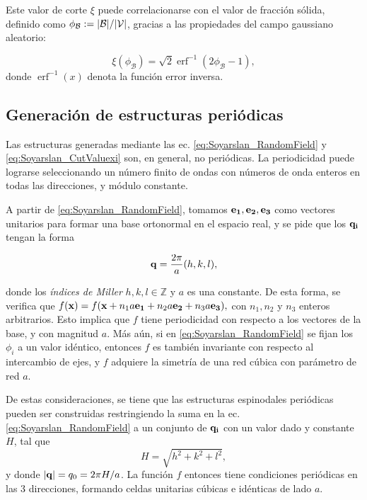 \documentclass{article}
\begin{document}
Este valor de corte $\xi$ puede correlacionarse con el valor de fracción sólida, definido como $\phi_\mathcal{B}:=\abs{\mathcal{B}}/\abs{\mathcal{V}}$, gracias a las propiedades del campo gaussiano aleatorio: 

\begin{equation}
    \xi(\phi_\mathcal{B}) = \sqrt{2}\operatorname{erf}^{-1}(2\phi_\mathcal{B}-1),
    \label{eq:Soyarslan_xiPhi_b}
\end{equation}
donde $\operatorname{erf}^{-1}(x)$ denota la función error inversa. 

\subsection{Generación de estructuras periódicas}
Las estructuras generadas mediante las ec. \eqref{eq:Soyarslan_RandomField} y \eqref{eq:Soyarslan_CutValuexi} son, en general, no periódicas. La periodicidad puede lograrse seleccionando un número finito de ondas con números de onda enteros en todas las direcciones, y módulo constante. 

A partir de \eqref{eq:Soyarslan_RandomField}, tomamos $\vb{e_1,e_2,e_3}$  como vectores unitarios para formar una base ortonormal en el espacio real, y se pide que los $\vb{q_i}$ tengan la forma 

\begin{equation}
    \vb{q} = \frac{2\pi}{a}(h,k,l),
    \label{eq:Soyarslan_q}
\end{equation}

donde los \textit{índices de Miller} $h,k,l\in\mathbb{Z}$ y $a$ es una constante. De esta forma, se verifica que $f(\vb{x}) = f(\vb{x}+n_1a\vb{e_1}+n_2a\vb{e_2}+n_3a\vb{e_3}),$ con $n_1,n_2$ y $n_3$ enteros arbitrarios. Esto implica que $f$ tiene periodicidad con respecto a los vectores de la base, y con magnitud $a$. Más aún, si en \eqref{eq:Soyarslan_RandomField} se fijan los $\phi_i$ a un valor idéntico, entonces $f$ es también invariante con respecto al intercambio de ejes, y $f$ adquiere la simetría de una red cúbica con parámetro de red $a$. 

De estas consideraciones, se tiene que las estructuras espinodales periódicas pueden ser construidas restringiendo la suma en la ec. \eqref{eq:Soyarslan_RandomField} a un conjunto de $\vb{q_i}$ con un valor dado y constante $H$, tal que
\begin{equation}
H = \sqrt{h^2+k^2+l^2},
\label{eq:H_Soyarslan}
\end{equation}
y donde $\abs{\vb{q}}=q_0=2\pi H/a$. La función $f$ entonces tiene condiciones periódicas en las 3 direcciones, formando celdas unitarias cúbicas e idénticas de lado $a$. 
\end{document}
